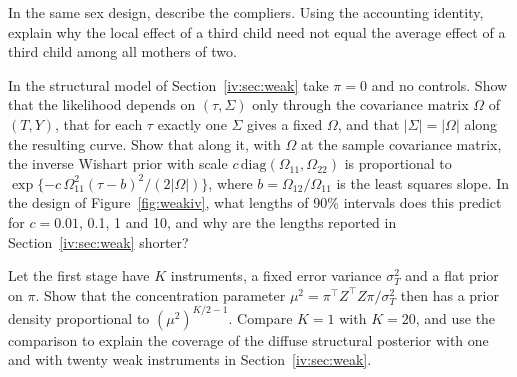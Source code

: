 \begin{exercises}
\item\label{ex:iv:samesex} In the same sex design, describe the compliers. Using the accounting identity, explain why the local effect of a third child need not equal the average effect of a third child among all mothers of two.
\item\label{ex:iv:iwscale} In the structural model of Section~\ref{iv:sec:weak} take $\pi = 0$ and no controls. Show that the likelihood depends on $(\tau, \Sigma)$ only through the covariance matrix $\Omega$ of $(T, Y)$, that for each $\tau$ exactly one $\Sigma$ gives a fixed $\Omega$, and that $|\Sigma| = |\Omega|$ along the resulting curve. Show that along it, with $\Omega$ at the sample covariance matrix, the inverse Wishart prior with scale $c\,\mathrm{diag}(\Omega_{11}, \Omega_{22})$ is proportional to $\exp\{-c\,\Omega_{11}^2(\tau - b)^2/(2|\Omega|)\}$, where $b = \Omega_{12}/\Omega_{11}$ is the least squares slope. In the design of Figure~\ref{fig:weakiv}, what lengths of 90\% intervals does this predict for $c = 0.01$, 0.1, 1 and 10, and why are the lengths reported in Section~\ref{iv:sec:weak} shorter?
\item\label{ex:iv:flatK} Let the first stage have $K$ instruments, a fixed error variance $\sigma_T^2$ and a flat prior on $\pi$. Show that the concentration parameter $\mu^2 = \pi^\top Z^\top Z\pi/\sigma_T^2$ then has a prior density proportional to $(\mu^2)^{K/2 - 1}$. Compare $K = 1$ with $K = 20$, and use the comparison to explain the coverage of the diffuse structural posterior with one and with twenty weak instruments in Section~\ref{iv:sec:weak}.
\end{exercises}
